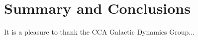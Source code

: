 \section{Summary and Conclusions} \label{sec:conclusions}


\begin{acknowledgements}

It is a pleasure to thank the CCA Galactic Dynamics Group...


\end{acknowledgements}






